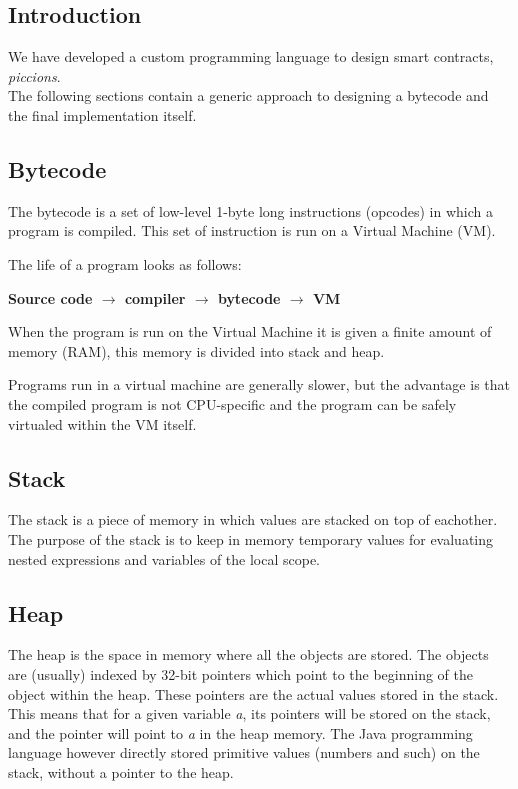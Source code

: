 \documentclass[../documentation.tex]{subfiles}
\begin{document}
\subsection{Introduction}

We have developed a custom programming language to design smart contracts, \textit{piccions}.
\\
The following sections contain a generic approach to designing a bytecode
and the final implementation itself.

\subsection{Bytecode}

The bytecode is a set of low-level 1-byte long instructions (opcodes) in which a program is compiled.
This set of instruction is run on a Virtual Machine (VM).

The life of a program looks as follows:

\begin{center}
\textbf{
    Source code \(\rightarrow\) compiler \(\rightarrow\) bytecode \(\rightarrow\) VM
}
\end{center}

When the program is run on the Virtual Machine it is given a finite amount of memory (RAM),
this memory is divided into stack and heap.

Programs run in a virtual machine are generally slower, but the advantage is that the
compiled program is not CPU-specific and the program can be safely virtualed within the VM itself.

\subsection{Stack}

The stack is a piece of memory in which values are stacked on top of eachother.
The purpose of the stack is to keep in memory temporary values for evaluating nested expressions and
variables of the local scope.

\subsection{Heap}

The heap is the space in memory where all the objects are stored.
The objects are (usually) indexed by 32-bit pointers which point to the beginning of the object within the heap.
These pointers are the actual values stored in the stack.
This means that for a given variable \textit{a}, its pointers will be stored on the stack, and the pointer will point to \textit{a} in the heap memory.
The Java programming language however directly stored primitive values (numbers and such) on the stack, without a pointer to the heap.
\end{document}

